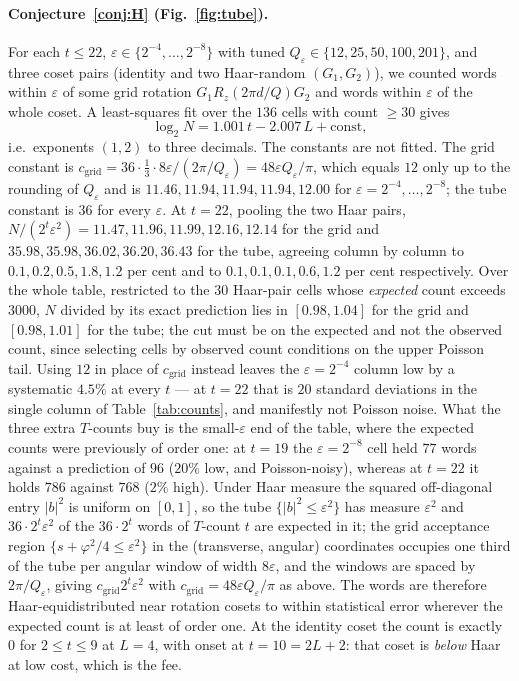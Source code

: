 \documentclass[aps,prx,twocolumn,superscriptaddress,nofootinbib,longbibliography]{revtex4-2}
\theoremstyle{plain}
\theoremstyle{definition}
\theoremstyle{remark}
\begin{document}
\paragraph{Conjecture~\ref{conj:H} (Fig.~\ref{fig:tube}).} For each $t\le22$, $\varepsilon\in\{2^{-4},\dots,2^{-8}\}$ with tuned $Q_\varepsilon\in\{12,25,50,100,201\}$, and three coset pairs (identity and two Haar-random $(G_1,G_2)$), we counted words within $\varepsilon$ of some grid rotation $G_1R_z(2\pi d/Q)G_2$ and words within $\varepsilon$ of the whole coset. A least-squares fit over the $136$ cells with count $\ge30$ gives
\begin{equation}
\log_2N=1.001\,t-2.007\,L+\text{const},
\end{equation}
i.e.\ exponents $(1,2)$ to three decimals. The constants are not fitted. The grid constant is $c_{\mathrm{grid}}=36\cdot\tfrac13\cdot8\varepsilon/(2\pi/Q_\varepsilon)=48\varepsilon Q_\varepsilon/\pi$, which equals $12$ only up to the rounding of $Q_\varepsilon$ and is $11.46,11.94,11.94,11.94,12.00$ for $\varepsilon=2^{-4},\dots,2^{-8}$; the tube constant is $36$ for every $\varepsilon$. At $t=22$, pooling the two Haar pairs, $N/(2^t\varepsilon^2)=11.47,11.96,11.99,12.16,12.14$ for the grid and $35.98,35.98,36.02,36.20,36.43$ for the tube, agreeing column by column to $0.1,0.2,0.5,1.8,1.2$ per cent and to $0.1,0.1,0.1,0.6,1.2$ per cent respectively. Over the whole table, restricted to the $30$ Haar-pair cells whose \emph{expected} count exceeds $3000$, $N$ divided by its exact prediction lies in $[0.98,1.04]$ for the grid and $[0.98,1.01]$ for the tube; the cut must be on the expected and not the observed count, since selecting cells by observed count conditions on the upper Poisson tail. Using $12$ in place of $c_{\mathrm{grid}}$ instead leaves the $\varepsilon=2^{-4}$ column low by a systematic $4.5\%$ at every $t$ --- at $t=22$ that is $20$ standard deviations in the single column of Table~\ref{tab:counts}, and manifestly not Poisson noise. What the three extra $T$-counts buy is the small-$\varepsilon$ end of the table, where the expected counts were previously of order one: at $t=19$ the $\varepsilon=2^{-8}$ cell held $77$ words against a prediction of $96$ ($20\%$ low, and Poisson-noisy), whereas at $t=22$ it holds $786$ against $768$ ($2\%$ high). Under Haar measure the squared off-diagonal entry $|b|^2$ is uniform on $[0,1]$, so the tube $\{|b|^2\le\varepsilon^2\}$ has measure $\varepsilon^2$ and $36\cdot2^t\varepsilon^2$ of the $36\cdot2^t$ words of $T$-count $t$ are expected in it; the grid acceptance region $\{s+\varphi^2/4\le\varepsilon^2\}$ in the (transverse, angular) coordinates occupies one third of the tube per angular window of width $8\varepsilon$, and the windows are spaced by $2\pi/Q_\varepsilon$, giving $c_{\mathrm{grid}}2^t\varepsilon^2$ with $c_{\mathrm{grid}}=48\varepsilon Q_\varepsilon/\pi$ as above. The words are therefore Haar-equidistributed near rotation cosets to within statistical error wherever the expected count is at least of order one. At the identity coset the count is exactly $0$ for $2\le t\le9$ at $L=4$, with onset at $t=10=2L+2$: that coset is \emph{below} Haar at low cost, which is the fee.
\end{document}
